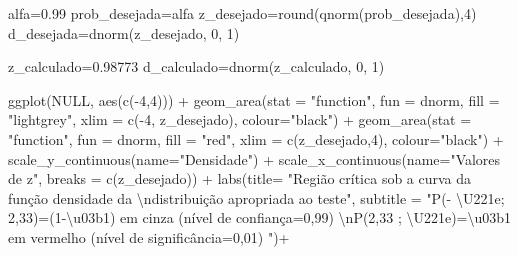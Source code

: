 \documentclass[
]{book}
\newenvironment{Shaded}{\begin{snugshade}}{\end{snugshade}}
\newcommand{\AttributeTok}[1]{\textcolor[rgb]{0.77,0.63,0.00}{#1}}
\newcommand{\ConstantTok}[1]{\textcolor[rgb]{0.00,0.00,0.00}{#1}}
\newcommand{\DecValTok}[1]{\textcolor[rgb]{0.00,0.00,0.81}{#1}}
\newcommand{\FloatTok}[1]{\textcolor[rgb]{0.00,0.00,0.81}{#1}}
\newcommand{\FunctionTok}[1]{\textcolor[rgb]{0.00,0.00,0.00}{#1}}
\newcommand{\NormalTok}[1]{#1}
\newcommand{\OtherTok}[1]{\textcolor[rgb]{0.56,0.35,0.01}{#1}}
\newcommand{\SpecialCharTok}[1]{\textcolor[rgb]{0.00,0.00,0.00}{#1}}
\newcommand{\StringTok}[1]{\textcolor[rgb]{0.31,0.60,0.02}{#1}}
\begin{document}
\begin{Shaded}
\begin{Highlighting}[]
\NormalTok{alfa}\OtherTok{=}\FloatTok{0.99}
\NormalTok{prob\_desejada}\OtherTok{=}\NormalTok{alfa}
\NormalTok{z\_desejado}\OtherTok{=}\FunctionTok{round}\NormalTok{(}\FunctionTok{qnorm}\NormalTok{(prob\_desejada),}\DecValTok{4}\NormalTok{)}
\NormalTok{d\_desejada}\OtherTok{=}\FunctionTok{dnorm}\NormalTok{(z\_desejado, }\DecValTok{0}\NormalTok{, }\DecValTok{1}\NormalTok{)}

\NormalTok{z\_calculado}\OtherTok{=}\FloatTok{0.98773}
\NormalTok{d\_calculado}\OtherTok{=}\FunctionTok{dnorm}\NormalTok{(z\_calculado, }\DecValTok{0}\NormalTok{, }\DecValTok{1}\NormalTok{)}




\FunctionTok{ggplot}\NormalTok{(}\ConstantTok{NULL}\NormalTok{, }\FunctionTok{aes}\NormalTok{(}\FunctionTok{c}\NormalTok{(}\SpecialCharTok{{-}}\DecValTok{4}\NormalTok{,}\DecValTok{4}\NormalTok{))) }\SpecialCharTok{+}
  \FunctionTok{geom\_area}\NormalTok{(}\AttributeTok{stat =} \StringTok{"function"}\NormalTok{, }
            \AttributeTok{fun =}\NormalTok{ dnorm, }
            \AttributeTok{fill =} \StringTok{"lightgrey"}\NormalTok{, }
            \AttributeTok{xlim =} \FunctionTok{c}\NormalTok{(}\SpecialCharTok{{-}}\DecValTok{4}\NormalTok{, z\_desejado),}
            \AttributeTok{colour=}\StringTok{"black"}\NormalTok{) }\SpecialCharTok{+}
  \FunctionTok{geom\_area}\NormalTok{(}\AttributeTok{stat =} \StringTok{"function"}\NormalTok{, }
            \AttributeTok{fun =}\NormalTok{ dnorm, }
            \AttributeTok{fill =} \StringTok{"red"}\NormalTok{, }
            \AttributeTok{xlim =} \FunctionTok{c}\NormalTok{(z\_desejado,}\DecValTok{4}\NormalTok{),}
            \AttributeTok{colour=}\StringTok{"black"}\NormalTok{) }\SpecialCharTok{+}
  \FunctionTok{scale\_y\_continuous}\NormalTok{(}\AttributeTok{name=}\StringTok{"Densidade"}\NormalTok{) }\SpecialCharTok{+}
  \FunctionTok{scale\_x\_continuous}\NormalTok{(}\AttributeTok{name=}\StringTok{"Valores de z"}\NormalTok{, }\AttributeTok{breaks =} \FunctionTok{c}\NormalTok{(z\_desejado))  }\SpecialCharTok{+}
  \FunctionTok{labs}\NormalTok{(}\AttributeTok{title=} 
         \StringTok{"Região crítica sob a curva da função densidade da }\SpecialCharTok{\textbackslash{}n}\StringTok{distribuição apropriada ao teste"}\NormalTok{, }
       \AttributeTok{subtitle =} \StringTok{"P({-} \textbackslash{}U221e; 2,33)=(1{-}\textbackslash{}u03b1) em cinza (nível de confiança=0,99) }\SpecialCharTok{\textbackslash{}n}\StringTok{P(2,33 ; \textbackslash{}U221e)=\textbackslash{}u03b1 em vermelho (nível de significância=0,01) "}\NormalTok{)}\SpecialCharTok{+}

\end{Highlighting}
\end{Shaded}
\end{document}
